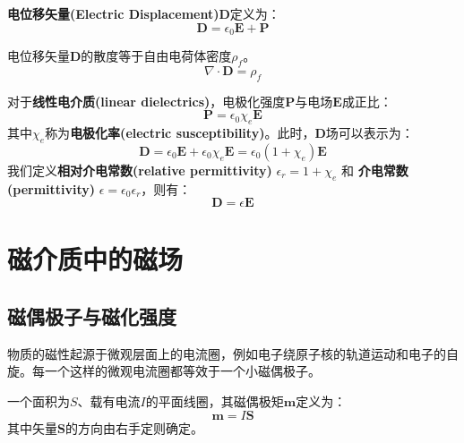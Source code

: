 \documentclass[fontset=none]{ctexart}
\begin{document}
\begin{definition}[电位移矢量]
    \textbf{电位移矢量(Electric Displacement)}$\bm{D}$定义为：
    \begin{equation}
        \bm{D} = \epsilon_0 \bm{E} + \bm{P}
    \end{equation}
\end{definition}
\begin{theorem}[介质中的高斯定律]
    电位移矢量$\bm{D}$的散度等于自由电荷体密度$\rho_f$。
    \begin{equation}
        \nabla \cdot \bm{D} = \rho_f
    \end{equation}
\end{theorem}

对于\textbf{线性电介质(linear dielectrics)}，电极化强度$\bm{P}$与电场$\bm{E}$成正比：
\begin{equation}
    \bm{P} = \epsilon_0 \chi_e \bm{E}
\end{equation}
其中$\chi_e$称为\textbf{电极化率(electric susceptibility)}。此时，$\bm{D}$场可以表示为：
\begin{equation}
    \bm{D} = \epsilon_0 \bm{E} + \epsilon_0 \chi_e \bm{E} = \epsilon_0 (1 + \chi_e) \bm{E}
\end{equation}
我们定义\textbf{相对介电常数(relative permittivity)} $\epsilon_r = 1+\chi_e$ 和 \textbf{介电常数(permittivity)} $\epsilon = \epsilon_0 \epsilon_r$，则有：
\begin{equation}
    \bm{D} = \epsilon \bm{E}
\end{equation}

\section{磁介质中的磁场}

\subsection{磁偶极子与磁化强度}
物质的磁性起源于微观层面上的电流圈，例如电子绕原子核的轨道运动和电子的自旋。每一个这样的微观电流圈都等效于一个小磁偶极子。

\begin{definition}[磁偶极矩]
    一个面积为$S$、载有电流$I$的平面线圈，其磁偶极矩$\bm{m}$定义为：
    \begin{equation}
        \bm{m} = I \bm{S}
    \end{equation}
    其中矢量$\bm{S}$的方向由右手定则确定。
\end{definition}
\end{document}
